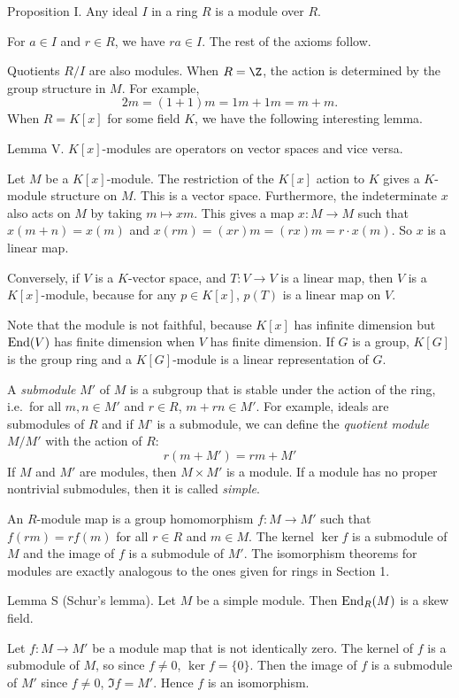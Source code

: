 \proclaim Proposition I. Any ideal $I$ in a ring $R$ is a module over $R$.

\proof For $a\in I$ and $r\in R$, we have $ra\in I$. The rest of the axioms follow.\slug

Quotients $R/I$ are also modules. When $R = \Z$, the action is determined by the group structure in $M$. For example,
$$2m = (1 + 1)m = 1m + 1m = m + m.$$
When $R = K[x]$ for some field $K$, we have the following interesting lemma.

\proclaim Lemma V. $K[x]$-modules are operators on vector spaces and vice versa.

\proof Let $M$ be a $K[x]$-module. The restriction of the $K[x]$ action to $K$ gives a $K$-module structure on $M$. This is a vector space. Furthermore, the indeterminate $x$ also acts on $M$ by taking $m\mapsto xm$. This gives a map $x: M \to M$ such that $x(m + n) = x(m)$ and $x(rm) = (xr)m = (rx)m = r\cdot x(m)$. So $x$ is a linear map.

Conversely, if $V$ is a $K$-vector space, and $T:V\to V$ is a linear map, then $V$ is a $K[x]$-module, because for any $p\in K[x]$, $p(T)$ is a linear map on $V$.\slug

Note that the module is not faithful, because $K[x]$ has infinite dimension but $\mathop {\rm End}(V)$ has finite dimension when $V$ has finite dimension. If $G$ is a group, $K[G]$ is the group ring and a $K[G]$-module is a linear representation of $G$.

A {\it submodule} $M'$ of $M$ is a subgroup that is stable under the action of the ring, i.e.\ for all $m, n\in M'$ and $r\in R$, $m+rn\in M'$. For example, ideals are submodules of $R$ and if $M$' is a submodule, we can define the {\it quotient module} $M/M'$ with the action of $R$:
$$ r(m+M') = rm + M'$$
If $M$ and $M'$ are modules, then $M\times M'$ is a module. If a module has no proper nontrivial submodules, then it is called {\it simple}.

An $R$-module map is a group homomorphism $f:M\to M'$ such that $f(rm) = rf(m)$ for all $r\in R$ and $m\in M$. The kernel $\ker f$ is a submodule of $M$ and the image of $f$ is a submodule of $M'$. The isomorphism theorems for modules are exactly analogous to the ones given for rings in Section 1.

\parenproclaim Lemma S (Schur's lemma). Let $M$ be a simple module. Then $\mathop {\rm End}_R(M)$ is a skew field.

\proof Let $f:M\to M'$ be a module map that is not identically zero. The kernel of $f$ is a submodule of $M$, so since $f\neq 0$, $\ker f = \{0\}$. Then the image of $f$ is a submodule of $M'$ since $f\neq 0$, $\Im f = M'$. Hence $f$ is an isomorphism.\slug

